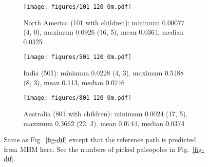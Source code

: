 \begin{figure*}
	\centering
	\begin{subfigure}{1.01\textwidth}
		\texttt{[image: figures/101\_120\_0m.pdf]}
		\caption{North America (101 with children): minimum 0.00077 (4, 0), maximum 0.0926 (16, 5), mean 0.0361, median 0.0325}\label{fig-nac-difm}
	\end{subfigure}
	\vspace{1em}
	\begin{subfigure}{1.01\textwidth}
		\texttt{[image: figures/501\_120\_0m.pdf]}
		\caption{India (501): minimum 0.0228 (4, 3), maximum 0.5188 (8, 3), mean 0.113, median 0.0746}\label{fig-ind-difm}
	\end{subfigure}
	\vspace{1em}
	\begin{subfigure}{1.01\textwidth}
		\texttt{[image: figures/801\_120\_0m.pdf]}
		\caption{Australia (801 with children): minimum 0.0024 (17, 5), maximum 0.3662 (22, 3), mean 0.0744, median 0.0374}\label{fig-au-difm}
	\end{subfigure}
	\caption[Differences of each plate's paleomagnetic APWPs versus
its MHM predicted APWP]{Same as Fig.~\ref{fig-dif} except that the reference
path is predicted from MHM here. See the numbers of picked paleopoles in
Fig.~\ref{fig-dif}.}\label{fig-difm}
\end{figure*}

